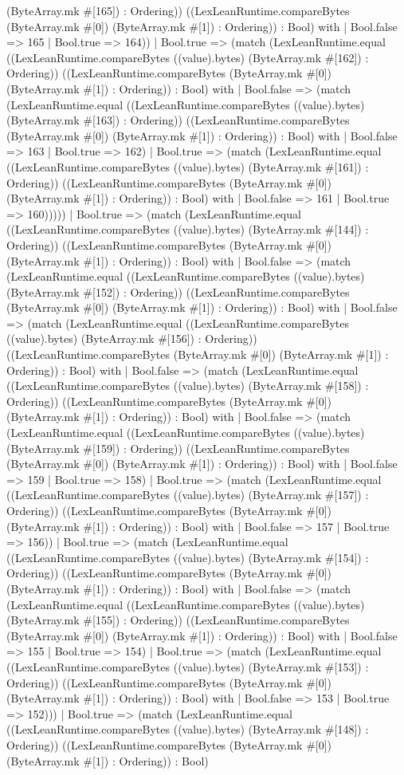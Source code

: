 \documentclass[11pt]{article}
\begin{document}
(ByteArray.mk \#[165]) : Ordering)) ((LexLeanRuntime.compareBytes (ByteArray.mk \#[0]) (ByteArray.mk \#[1]) : Ordering)) : Bool) with | Bool.false => 165 | Bool.true => 164)) | Bool.true => (match (LexLeanRuntime.equal ((LexLeanRuntime.compareBytes ((value).bytes) (ByteArray.mk \#[162]) : Ordering)) ((LexLeanRuntime.compareBytes (ByteArray.mk \#[0]) (ByteArray.mk \#[1]) : Ordering)) : Bool) with | Bool.false => (match (LexLeanRuntime.equal ((LexLeanRuntime.compareBytes ((value).bytes) (ByteArray.mk \#[163]) : Ordering)) ((LexLeanRuntime.compareBytes (ByteArray.mk \#[0]) (ByteArray.mk \#[1]) : Ordering)) : Bool) with | Bool.false => 163 | Bool.true => 162) | Bool.true => (match (LexLeanRuntime.equal ((LexLeanRuntime.compareBytes ((value).bytes) (ByteArray.mk \#[161]) : Ordering)) ((LexLeanRuntime.compareBytes (ByteArray.mk \#[0]) (ByteArray.mk \#[1]) : Ordering)) : Bool) with | Bool.false => 161 | Bool.true => 160))))) | Bool.true => (match (LexLeanRuntime.equal ((LexLeanRuntime.compareBytes ((value).bytes) (ByteArray.mk \#[144]) : Ordering)) ((LexLeanRuntime.compareBytes (ByteArray.mk \#[0]) (ByteArray.mk \#[1]) : Ordering)) : Bool) with | Bool.false => (match (LexLeanRuntime.equal ((LexLeanRuntime.compareBytes ((value).bytes) (ByteArray.mk \#[152]) : Ordering)) ((LexLeanRuntime.compareBytes (ByteArray.mk \#[0]) (ByteArray.mk \#[1]) : Ordering)) : Bool) with | Bool.false => (match (LexLeanRuntime.equal ((LexLeanRuntime.compareBytes ((value).bytes) (ByteArray.mk \#[156]) : Ordering)) ((LexLeanRuntime.compareBytes (ByteArray.mk \#[0]) (ByteArray.mk \#[1]) : Ordering)) : Bool) with | Bool.false => (match (LexLeanRuntime.equal ((LexLeanRuntime.compareBytes ((value).bytes) (ByteArray.mk \#[158]) : Ordering)) ((LexLeanRuntime.compareBytes (ByteArray.mk \#[0]) (ByteArray.mk \#[1]) : Ordering)) : Bool) with | Bool.false => (match (LexLeanRuntime.equal ((LexLeanRuntime.compareBytes ((value).bytes) (ByteArray.mk \#[159]) : Ordering)) ((LexLeanRuntime.compareBytes (ByteArray.mk \#[0]) (ByteArray.mk \#[1]) : Ordering)) : Bool) with | Bool.false => 159 | Bool.true => 158) | Bool.true => (match (LexLeanRuntime.equal ((LexLeanRuntime.compareBytes ((value).bytes) (ByteArray.mk \#[157]) : Ordering)) ((LexLeanRuntime.compareBytes (ByteArray.mk \#[0]) (ByteArray.mk \#[1]) : Ordering)) : Bool) with | Bool.false => 157 | Bool.true => 156)) | Bool.true => (match (LexLeanRuntime.equal ((LexLeanRuntime.compareBytes ((value).bytes) (ByteArray.mk \#[154]) : Ordering)) ((LexLeanRuntime.compareBytes (ByteArray.mk \#[0]) (ByteArray.mk \#[1]) : Ordering)) : Bool) with | Bool.false => (match (LexLeanRuntime.equal ((LexLeanRuntime.compareBytes ((value).bytes) (ByteArray.mk \#[155]) : Ordering)) ((LexLeanRuntime.compareBytes (ByteArray.mk \#[0]) (ByteArray.mk \#[1]) : Ordering)) : Bool) with | Bool.false => 155 | Bool.true => 154) | Bool.true => (match (LexLeanRuntime.equal ((LexLeanRuntime.compareBytes ((value).bytes) (ByteArray.mk \#[153]) : Ordering)) ((LexLeanRuntime.compareBytes (ByteArray.mk \#[0]) (ByteArray.mk \#[1]) : Ordering)) : Bool) with | Bool.false => 153 | Bool.true => 152))) | Bool.true => (match (LexLeanRuntime.equal ((LexLeanRuntime.compareBytes ((value).bytes) (ByteArray.mk \#[148]) : Ordering)) ((LexLeanRuntime.compareBytes (ByteArray.mk \#[0]) (ByteArray.mk \#[1]) : Ordering)) : Bool) 
\end{document}
